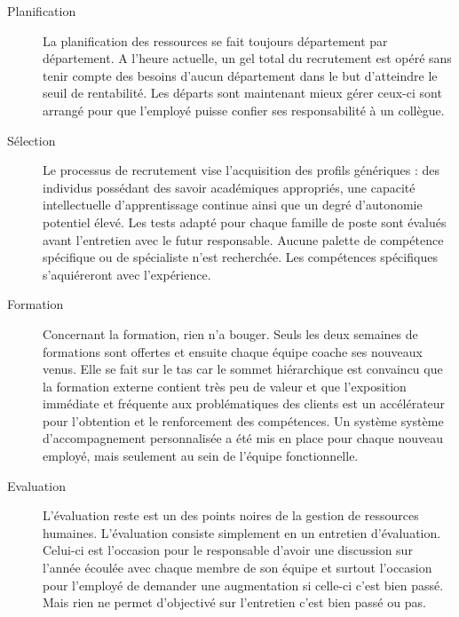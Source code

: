 \begin{description}
  \item[Planification] La planification des ressources se fait toujours département par département. A l'heure actuelle, un gel total du recrutement est opéré sans tenir compte des besoins d'aucun département dans le but d'atteindre le seuil de rentabilité. Les départs sont maintenant mieux gérer ceux-ci sont arrangé pour que l'employé puisse confier ses responsabilité à un collègue.
  \item[Sélection] Le processus de recrutement vise l’acquisition des profils génériques : des individus possédant des savoir académiques appropriés, une capacité intellectuelle d’apprentissage continue ainsi que un degré d’autonomie potentiel élevé. Les tests adapté pour chaque famille de poste sont évalués avant l'entretien avec le futur responsable.  Aucune palette de compétence spécifique ou de spécialiste n'est recherchée. Les compétences spécifiques s'aquiéreront avec l'expérience. 
  
  \item[Formation] Concernant la formation, rien n'a bouger. Seuls les deux semaines de formations sont offertes et ensuite chaque équipe coache ses nouveaux venus. Elle se fait sur le tas car le sommet hiérarchique est convaincu que la formation externe contient très peu de valeur et que l’exposition immédiate et fréquente aux problématiques des clients est un accélérateur pour l’obtention et le renforcement des compétences. Un système système d’accompagnement personnalisée a été mis en place pour chaque nouveau employé, mais seulement au sein de l'équipe fonctionnelle. 
  \item[Evaluation] L'évaluation reste est un des points noires de la gestion de ressources humaines. L'évaluation consiste simplement en un entretien d'évaluation. Celui-ci est l'occasion pour le responsable d'avoir une discussion sur l'année écoulée avec chaque membre de son équipe et surtout l'occasion pour l'employé de demander une augmentation si celle-ci c'est bien passé. Mais rien ne permet d'objectivé sur l'entretien c'est bien passé ou pas.  

\end{description}
